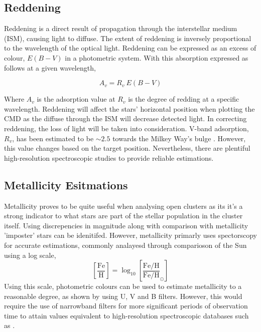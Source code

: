 \subsection{Reddening}

Reddening is a direct result of propagation through the interstellar medium (ISM), causing light to diffuse. The extent of reddening is inversely proportional to the wavelength of the optical light. Reddening can be expressed as an excess of colour, $E(B - V)$ in a photometric system. With this absorption expressed as follows at a given wavelength, 

\begin{equation}
A_v = R_v \ E(B - V)
\end{equation}

Where $A_v$ is the adsorption value at $R_v$ is the degree of redding at a specific wavelength. Reddening will affect the stars' horizontal position when plotting the CMD as the diffuse through the ISM will decrease detected light. In correcting reddening, the loss of light will be taken into consideration. V-band adsorption, $R_v$, has been estimated to be $\sim 2.5$ towards the Milkey Way's bulge \citep{DAVID_M_Reddening}. However, this value changes based on the target position. Nevertheless, there are plentiful high-resolution spectroscopic studies to provide reliable estimations.

\subsection{Metallicity Esitmations} \label{sec: metallicity}
Metallicity proves to be quite useful when analysing open clusters as its it's a strong indicator to what stars are part of the stellar population in the cluster itself. Using discrepencies in magnitude along with comparison with metallicity 'imposter' stars can be idenitifed. However, metallicity primarly uses spectorscopy for accurate estimations, commonly analayesd through comparioson of the Sun using a log scale, 
\begin{equation}
    \left[ \frac{\text{Fe}}{\text{H}} \right] = \log_{10} \left[ \frac{\text{Fe/H}}{\text{Fe/H}}_\odot \right] 
\end{equation}
Using this scale, photometric colours can be used to estimate metallicity to a reasonable degree, as shown by \cite{kar} using U, V and B filters. However, this would require the use of narrowband filters for more significant periods of observation time to attain values equivalent to high-resolution spectroscopic databases such as \cite{Metallicity_catalogue}. 

